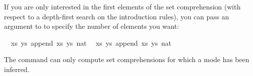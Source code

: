 \begin{isabellebody}
\begin{isamarkuptext}
\end{isamarkuptext}%
\isamarkuptrue%
%
\begin{isamarkuptext}%
\noindent If you are only interested in the first elements of the set
comprehension (with respect to a depth-first search on the introduction rules), you can
pass an argument to
\hyperlink{command.values}{\mbox{}} to specify the number of elements you want:%
\end{isamarkuptext}%
\isamarkuptrue%
%
\isadelimquote
%
\endisadelimquote
%
\isatagquote
{}\isamarkupfalse%
\ {}\ {\isachardoublequoteopen}{\isacharbraceleft}{\isacharparenleft}xs{\isacharcomma}\ ys{\isacharparenright}{\isachardot}\ append\ xs\ ys\ {\isacharbrackleft}{\isacharparenleft}{}{\isacharcolon}{\isacharcolon}nat{\isacharparenright}{\isacharcomma}{}{\isacharcomma}{}{\isacharcomma}{}{\isacharbrackright}{\isacharbraceright}{\isachardoublequoteclose}\isanewline
{}\isamarkupfalse%
\ {}\ {\isachardoublequoteopen}{\isacharbraceleft}{\isacharparenleft}xs{\isacharcomma}\ ys{\isacharparenright}{\isachardot}\ append\ xs\ ys\ {\isacharbrackleft}{\isacharparenleft}{}{\isacharcolon}{\isacharcolon}nat{\isacharparenright}{\isacharcomma}{}{\isacharcomma}{}{\isacharcomma}{}{\isacharbrackright}{\isacharbraceright}{\isachardoublequoteclose}%
\endisatagquote
{\isafoldquote}%
%
\isadelimquote
%
\endisadelimquote
%
\begin{isamarkuptext}%
\noindent The \hyperlink{command.values}{\mbox{}} command can only compute set
 comprehensions for which a mode has been inferred.


\end{isamarkuptext}
\end{isabellebody}
